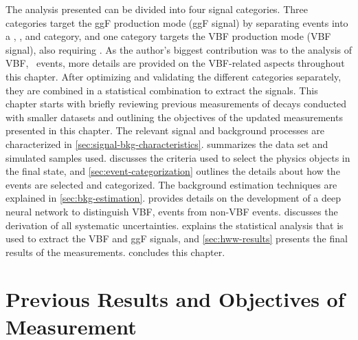 The analysis presented can be divided into four signal categories. Three categories target the ggF production mode (ggF signal) by separating events into a \ZeroJet, \OneJet, and \TwoJet category, and one category targets the VBF production mode (VBF signal), also requiring \TwoJet. 
As the author's biggest contribution was to the analysis of VBF, \HWW\ events, more details are provided on the VBF-related aspects throughout this chapter. 
After optimizing and validating the different categories separately, they are combined in a statistical combination to extract the signals.  
This chapter starts with briefly reviewing previous measurements of \HWW decays conducted with smaller datasets and outlining the objectives of the updated measurements presented in this chapter. 
The relevant signal and background processes are characterized in \cref{sec:signal-bkg-characteristics}. 
 summarizes the data set and simulated samples used.
 discusses the criteria used to select the physics objects in the final state, and \cref{sec:event-categorization} outlines the details about how the events are selected and categorized. 
The background estimation techniques are explained in \cref{sec:bkg-estimation}. 
 provides details on the development of a deep neural network to distinguish VBF, \HWW events from non-VBF events. 
 discusses the derivation of all systematic uncertainties. 
 explains the statistical analysis that is used to extract the VBF and ggF signals, and \cref{sec:hww-results} presents the final results of the measurements.
 concludes this chapter.





\section{Previous Results and Objectives of Measurement}
\label{sec:prev-results}



